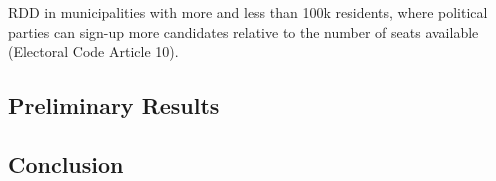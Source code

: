 \documentclass[]{article}
\begin{document}
RDD in municipalities with more and less than 100k residents, where
political parties can sign-up more candidates relative to the number of
seats available (Electoral Code Article 10).

\hypertarget{preliminary-results}{%
\subsection{Preliminary Results}\label{preliminary-results}}

\hypertarget{conclusion}{%
\subsection{Conclusion}\label{conclusion}}
\end{document}
